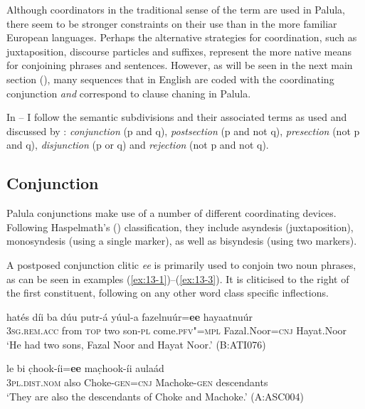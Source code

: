 Although coordinators in the traditional sense of the term are used in Palula, there seem to be stronger constraints on their use than in the more familiar European languages. Perhaps the alternative strategies for coordination, such as juxtaposition, discourse particles and suffixes, represent the more native means for conjoining phrases and sentences. However, as will be seen in the next main section (), many sequences that in English are coded with the coordinating conjunction \textit{and} correspond to clause chaning in Palula.



In -- I follow the semantic subdivisions and their associated terms as used and discussed by \citet{payne1985}: \textit{conjunction} (p and q), \textit{postsection} (p and not q), \textit{presection} (not p and q), \textit{disjunction} (p or q) and \textit{rejection} (not p and not q).


\subsection{Conjunction}
\label{subsec:13-2-1}

Palula conjunctions make use of a number of different coordinating devices. Following Haspelmath's (\citeyear{haspelmath2007}) classification, they include asyndesis (juxtaposition), monosyndesis (using a single marker), as well as bisyndesis (using two markers).

 A postposed conjunction clitic \textit{ee} is primarily used to conjoin two noun phrases, as can be seen in examples (\ref{ex:13-1})--(\ref{ex:13-3}). It is cliticised to the right of the first constituent, following on any other word class specific inflections.

\ea
\label{ex:13-1}
\gll hatés díi ba dúu putr-á yúul-a {\ob}fazelnuúr=\textbf{ee} hayaatnuúr{\cb}\\
\textsc{3sg.rem.acc} from \textsc{top} two son-\textsc{pl} come.\textsc{pfv"=mpl} Fazal.Noor=\textsc{cnj} Hayat.Noor\\
\glt `He had two sons, Fazal Noor and Hayat Noor.' (B:ATI076) 

\ex
\label{ex:13-2}
\gll le bi {\ob}c̣hook-íi=\textbf{ee} mac̣hook-íi{\cb} aulaád \\
\textsc{3pl.dist.nom} also Choke-\textsc{gen=cnj} Machoke-\textsc{gen} descendants\\
\glt `They are also the descendants of Choke and Machoke.' (A:ASC004)

